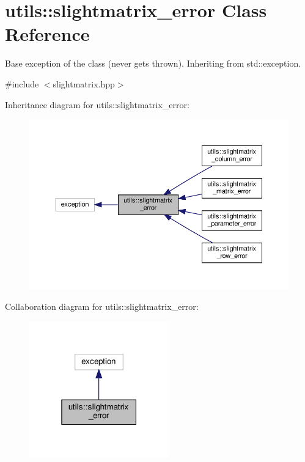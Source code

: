 \hypertarget{classutils_1_1slightmatrix__error}{}\section{utils\+:\+:slightmatrix\+\_\+error Class Reference}
\label{classutils_1_1slightmatrix__error}


Base exception of the class (never gets thrown). Inheriting from std\+::exception.  




{\ttfamily \#include $<$slightmatrix.\+hpp$>$}



Inheritance diagram for utils\+:\+:slightmatrix\+\_\+error\+:
\nopagebreak
\begin{figure}[H]
\begin{center}
\leavevmode
\includegraphics[width=350pt]{classutils_1_1slightmatrix__error__inherit__graph}
\end{center}
\end{figure}


Collaboration diagram for utils\+:\+:slightmatrix\+\_\+error\+:
\nopagebreak
\begin{figure}[H]
\begin{center}
\leavevmode
\includegraphics[width=171pt]{classutils_1_1slightmatrix__error__coll__graph}
\end{center}
\end{figure}


